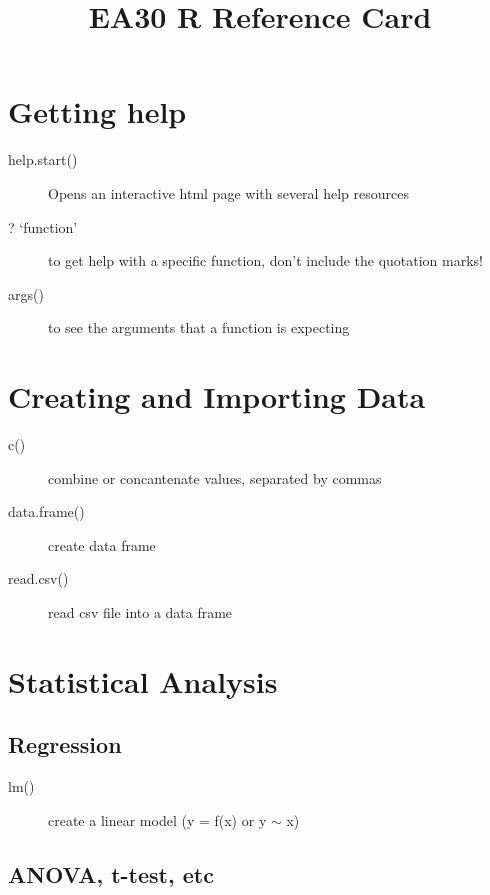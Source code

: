 \documentclass{article}\usepackage[]{graphicx}\usepackage[]{color}
\title{EA30 R Reference Card}
\begin{document}
\maketitle

\begin{multicols}{3}


\section*{Getting help}

\begin{description}
  \item[help.start()] Opens an interactive html page with several help resources
  \item[? `function'] to get help with a specific function, don't include the quotation marks!
  \item[args()] to see the arguments that a function is expecting
\end{description}

\section*{Creating and Importing Data}

\begin{description}
\item[c()] combine or concantenate values, separated by commas
\item[data.frame()] create data frame
\item[read.csv()] read csv file into a data frame
\end{description}

\section*{Statistical Analysis}

\subsection*{Regression}

\begin{description}
\item[lm()] create a linear model (y = f(x) or y $\sim$ x)
\end{description}

\subsection*{ANOVA, t-test, etc}


\end{multicols}
\end{document}
